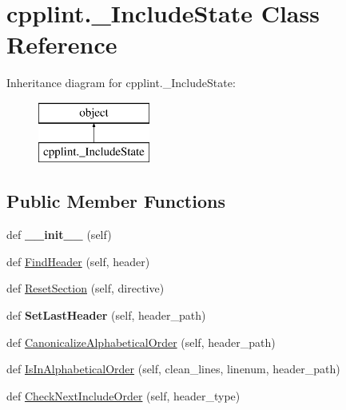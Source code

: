 \hypertarget{classcpplint_1_1__IncludeState}{}\section{cpplint.\+\_\+\+Include\+State Class Reference}
\label{classcpplint_1_1__IncludeState}
Inheritance diagram for cpplint.\+\_\+\+Include\+State\+:\begin{figure}[H]
\begin{center}
\leavevmode
\includegraphics[height=2.000000cm]{classcpplint_1_1__IncludeState}
\end{center}
\end{figure}
\subsection*{Public Member Functions}
\begin{DoxyCompactItemize}
\item 
def {\bfseries \+\_\+\+\_\+init\+\_\+\+\_\+} (self)\hypertarget{classcpplint_1_1__IncludeState_a4d3ae4ee2a38efc25cce07e3e8484ba4}{}\label{classcpplint_1_1__IncludeState_a4d3ae4ee2a38efc25cce07e3e8484ba4}

\item 
def \hyperlink{classcpplint_1_1__IncludeState_a9bddbf581fc7a4c3c0258eaa42b94c3a}{Find\+Header} (self, header)
\item 
def \hyperlink{classcpplint_1_1__IncludeState_a31551f83fcc626e7babb1581a486b6fa}{Reset\+Section} (self, directive)
\item 
def {\bfseries Set\+Last\+Header} (self, header\+\_\+path)\hypertarget{classcpplint_1_1__IncludeState_a9bc1ada2060a49628c1fffa973b57df1}{}\label{classcpplint_1_1__IncludeState_a9bc1ada2060a49628c1fffa973b57df1}

\item 
def \hyperlink{classcpplint_1_1__IncludeState_ae69c652befa2d160194c0a02ff0c7d48}{Canonicalize\+Alphabetical\+Order} (self, header\+\_\+path)
\item 
def \hyperlink{classcpplint_1_1__IncludeState_abfda27324121ab0bf9d29866d975274b}{Is\+In\+Alphabetical\+Order} (self, clean\+\_\+lines, linenum, header\+\_\+path)
\item 
def \hyperlink{classcpplint_1_1__IncludeState_a80f82f17565e8412e7e5bbe52b464f18}{Check\+Next\+Include\+Order} (self, header\+\_\+type)
\end{DoxyCompactItemize}
